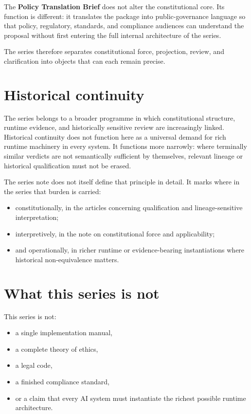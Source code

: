\documentclass[11pt]{article}
\begin{document}
The \textbf{Policy Translation Brief} does not alter the constitutional core. Its function is different: it translates the package into public-governance language so that policy, regulatory, standards, and compliance audiences can understand the proposal without first entering the full internal architecture of the series.

The series therefore separates constitutional force, projection, review, and clarification into objects that can each remain precise.

\section{Historical continuity}

The series belongs to a broader programme in which constitutional structure, runtime evidence, and historically sensitive review are increasingly linked. Historical continuity does not function here as a universal demand for rich runtime machinery in every system. It functions more narrowly: where terminally similar verdicts are not semantically sufficient by themselves, relevant lineage or historical qualification must not be erased.

The series note does not itself define that principle in detail. It marks where in the series that burden is carried:
\begin{itemize}[leftmargin=2em]
    \item constitutionally, in the articles concerning qualification and lineage-sensitive interpretation;
    \item interpretively, in the note on constitutional force and applicability;
    \item and operationally, in richer runtime or evidence-bearing instantiations where historical non-equivalence matters.
\end{itemize}

\section{What this series is not}

This series is not:
\begin{itemize}[leftmargin=2em]
    \item a single implementation manual,
    \item a complete theory of ethics,
    \item a legal code,
    \item a finished compliance standard,
    \item or a claim that every AI system must instantiate the richest possible runtime architecture.
\end{itemize}
\end{document}
